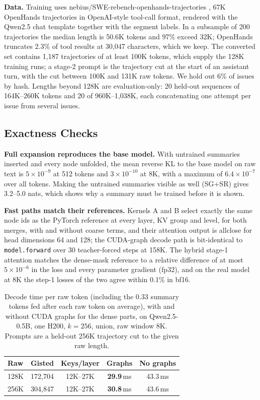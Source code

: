 \documentclass[10pt,twocolumn]{article}
\newcommand{\para}[1]{\noindent\textbf{#1}\hspace{0.5em}}
\begin{document}
\para{Data.}
Training uses nebius/SWE-rebench-openhands-trajectories \citep{badertdinov2025swerebench,
wang2025openhands}, 67K OpenHands trajectories in OpenAI-style tool-call format, rendered with
the Qwen2.5 chat template together with the segment labels. In a subsample of 200
trajectories the median length is 50.6K tokens and 97\% exceed 32K; OpenHands truncates 2.3\% of tool results
at 30,047 characters, which we keep. The converted set contains 1,187 trajectories of at
least 100K tokens, which supply the 128K training runs; a stage-2 prompt is the trajectory cut
at the start of an assistant turn, with the cut between 100K and 131K raw tokens. We hold out
6\% of issues by hash. Lengths beyond 128K
are evaluation-only: 20 held-out sequences of 164K--260K tokens and 20 of 960K--1,038K, each
concatenating one attempt per issue from several issues.

\subsection{Exactness Checks}
\label{sec:exact}

\para{Full expansion reproduces the base model.}
With untrained summaries inserted and every node unfolded, the mean reverse KL to the base
model on raw text is $5\times10^{-9}$ at 512 tokens and $3\times10^{-10}$ at 8K, with a maximum of
$6.4\times10^{-7}$ over all tokens. Making the untrained summaries visible as well (SG+SR) gives
3.2--5.0 nats, which shows why a summary must be trained before it is shown.

\para{Fast paths match their references.}
Kernels A and B select exactly the same node ids as the PyTorch reference at every layer, KV
group and level, for both merges, with and without coarse terms, and their attention output is
allclose for head dimensions 64 and 128; the CUDA-graph decode path is bit-identical to
\texttt{model.forward} over 30 teacher-forced steps at 158K. The hybrid stage-1 attention
matches the dense-mask reference to a relative difference of at most $5\times10^{-6}$ in the
loss and every parameter gradient (fp32), and on the real model at 8K the step-1 losses of the
two agree within 0.1\% in bf16.

\begin{table}[t]
\caption{Decode time per raw token (including the 0.33 summary tokens fed after each raw token
on average), with and without CUDA graphs for the dense parts, on Qwen2.5-0.5B, one H200, $k=256$, union, raw window 8K. Prompts are a held-out
256K trajectory cut to the given raw length.}
\label{tab:decode}
\centering\small
\begin{tabular}{lcccc}
\toprule
Raw & Gisted & Keys/layer & Graphs & No graphs \\
\midrule
128K & 172,704 & 12K--27K & \textbf{29.9}\,ms & 43.3\,ms \\
256K & 304,847 & 12K--27K & \textbf{30.8}\,ms & 43.6\,ms \\
\bottomrule
\end{tabular}
\end{table}
\end{document}
